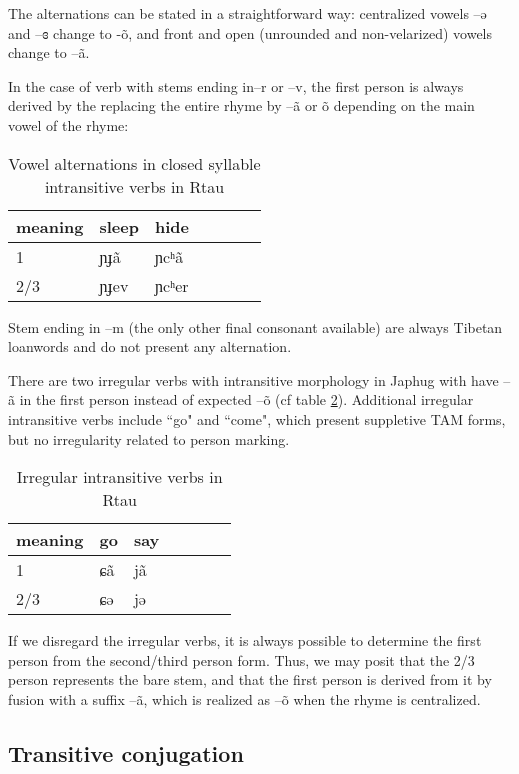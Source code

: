 \documentclass[oldfontcommands,oneside,a4paper,11pt]{article}
\newcommand{\ipa}[1]{{\phon #1}} %
\begin{document}
The alternations can be stated in a straightforward way: centralized vowels  --\ipa{ə} and  --\ipa{ɞ} change to -\ipa{õ}, and front and open (unrounded and non-velarized) vowels change to --\ipa{ã}.

In the case of verb with stems ending in--\ipa{r} or --\ipa{v}, the first person is always derived by the replacing the entire rhyme by --\ipa{ã} or \ipa{õ} depending on the main vowel of the rhyme:
\begin{table}[H]
\caption{Vowel alternations in closed syllable intransitive verbs in Rtau} \label{tab:close.intr} \centering
\begin{tabular}{llll|ll|l}
\toprule
meaning &	sleep   &  	hide   \\  
\midrule
1&	\ipa{ɲɟã} & 	\ipa{ɲcʰã} \\ 
2/3&	\ipa{ɲɟev} & 	\ipa{ɲcʰer} \\ 
\bottomrule
\end{tabular}
\end{table}
Stem ending in --\ipa{m} (the only other final consonant available) are always Tibetan loanwords and do not present any alternation.


There are two irregular verbs with intransitive morphology in Japhug with have \ipa{--ã} in the first person instead of expected \ipa{--õ} (cf table \ref{tab:irr.intr}). Additional irregular intransitive verbs include ``go" and ``come", which present suppletive TAM forms, but no irregularity related to person marking.




\begin{table}[H]
\caption{Irregular intransitive verbs in Rtau} \label{tab:irr.intr} \centering
\begin{tabular}{llll|ll|l}
\toprule
meaning &	go     & say \\  
\midrule
1&	\ipa{ɕã}  	 &\ipa{jã}\\ 
2/3&	\ipa{ɕə} & 	\ipa{jə} &\\ 
\bottomrule
\end{tabular}
\end{table}

If we disregard the irregular verbs, it is always possible to determine the first person from the second/third person form. Thus, we may posit that the 2/3 person represents the bare stem, and that the first person is derived from it by fusion with a suffix --\ipa{ã}, which is realized as --\ipa{õ} when the rhyme is centralized.

\subsection{Transitive conjugation} \label{sec:tr}
\end{document}

